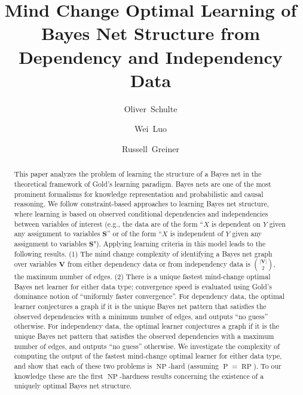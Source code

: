\documentclass{elsarticle}%
\author[sfu]{Oliver~Schulte\corref{cor1}}
\author[uq]{Wei~Luo}
\author[ua]{Russell~Greiner}
\DeclareMathOperator{\Poly}{\mathbf{\mathrm{P}}}
\DeclareMathOperator{\RP}{\mathbf{\mathrm{RP}}}
\DeclareMathOperator{\NP}{\mathbf{\mathrm{NP}}}
\renewcommand{\S}{\mathbf{{S}}}
\begin{document}
\begin{abstract}
  This paper analyzes the problem of learning the structure of a Bayes net in the theoretical framework of Gold's learning paradigm. Bayes nets are one of the most prominent formalisms for knowledge representation and probabilistic and causal reasoning.
  We follow constraint-based approaches to learning Bayes net structure, where learning is based on %
  observed conditional dependencies and independencies between variables of interest
  (e.g., the data are of the form ``$X$ is dependent on $Y$ given any assignment to variables $\S$'' or of the form ``$X$ is independent of $Y$ given any assignment to variables $\S$").
  Applying learning criteria in this model leads to the following results. (1) The mind change complexity of identifying a Bayes net graph over variables $\mathbf{V}$
  from either dependency data or from independency data is ${\binom{|\mathbf{V}|}{2}}$, the maximum number of edges.
  (2) There is a unique fastest mind-change optimal Bayes net learner for either data type; convergence speed is evaluated using Gold's dominance notion of  ``uniformly faster convergence''. For dependency data, the optimal learner conjectures a graph if it is the unique Bayes net pattern that satisfies the observed dependencies with a minimum number of edges, and outputs ``no guess'' otherwise.   %
  For independency data, the optimal learner conjectures a graph if it is the unique Bayes net pattern that satisfies the observed dependencies with a maximum number of edges, and outputs ``no guess'' otherwise.
We investigate the complexity of computing the output of the fastest mind-change optimal learner for either data type, and show that each of these two problems is $\NP$-hard (assuming $\Poly = \RP$). To our knowledge these are the first $\NP$-hardness results concerning the existence of a uniquely optimal Bayes net structure.
\end{abstract}

\title{Mind Change Optimal Learning of Bayes Net Structure from Dependency and Independency  Data}

\maketitle
\end{document}
